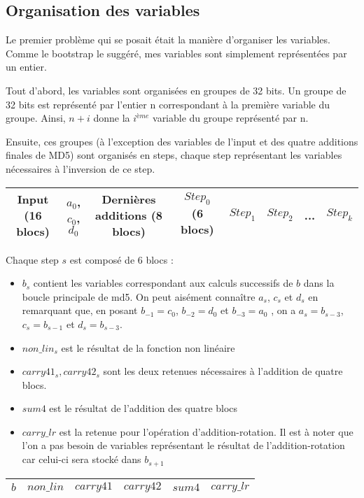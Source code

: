 \documentclass{article}
\begin{document}
\subsection{Organisation des variables}
Le premier problème qui se posait était la manière d'organiser les variables. Comme le bootstrap le suggéré, mes variables sont simplement représentées par un entier. 
\par
Tout d'abord, les variables sont organisées en groupes de 32 bits. Un groupe de 32 bits est représenté par l'entier n correspondant à la première variable du groupe. Ainsi, $n + i$ donne la $i^{ème}$ variable du groupe représenté par n. 
\par
Ensuite, ces groupes (à l'exception des variables de l'input et des quatre additions finales de MD5) sont organisés en steps, chaque step représentant les variables nécessaires à l'inversion de ce step.
\newline

\begin{tabular}{|c|c|c|c|c|c|c|c|}
   \hline
   Input (16 blocs) & $a_0$,$c_0$,$d_0$ & Dernières additions (8 blocs)& $Step_0$ (6 blocs) & $Step_1$ & $Step_2$ & ... & $Step_k$   \\
   \hline
\end{tabular}
\newline
\par
Chaque step $s$ est composé de 6 blocs : 
\begin{itemize}
\item $b_s$ contient les variables correspondant aux calculs successifs de $b$ dans la boucle principale de md5. On peut aisément connaître $a_s$, $c_s$ et $d_s$ en remarquant que, en posant $b_{-1} = c_0$, $b_{-2} = d_0$ et $b_{-3} = a_0$ , on a $a_s = b_{s-3}$, $c_s = b_{s-1}$ et  $d_s = b_{s-3}$.
\item $non\_lin_s$ est le résultat de la fonction non linéaire
\item $carry41_s, carry42_s$ sont les deux retenues nécessaires à l'addition de quatre blocs.
\item $sum4$ est le résultat de l'addition des quatre blocs
\item $carry\_lr$ est la retenue pour l'opération d'addition-rotation. Il est à noter que l'on a pas besoin de variables représentant le résultat de l'addition-rotation car celui-ci sera stocké dans $b_{s+1}$
\end{itemize}

\vspace{0.4cm}
\begin{tabular}{|c|c|c|c|c|c|}
   \hline
    $b$& $non\_lin$ & $carry41$ & $carry42$ & $sum4$ & $carry\_lr$ \\
   \hline
\end{tabular}
\end{document}

